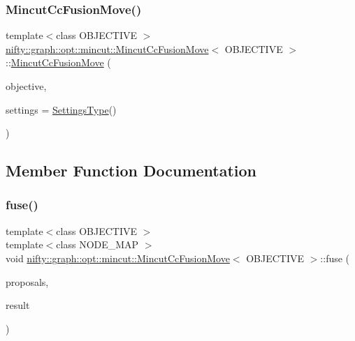 \subsubsection{\texorpdfstring{Mincut\+Cc\+Fusion\+Move()}{MincutCcFusionMove()}}
{\footnotesize\ttfamily template$<$class O\+B\+J\+E\+C\+T\+I\+VE $>$ \\
\hyperlink{classnifty_1_1graph_1_1opt_1_1mincut_1_1MincutCcFusionMove}{nifty\+::graph\+::opt\+::mincut\+::\+Mincut\+Cc\+Fusion\+Move}$<$ O\+B\+J\+E\+C\+T\+I\+VE $>$\+::\hyperlink{classnifty_1_1graph_1_1opt_1_1mincut_1_1MincutCcFusionMove}{Mincut\+Cc\+Fusion\+Move} (\begin{DoxyParamCaption}\item[{const \hyperlink{classnifty_1_1graph_1_1opt_1_1mincut_1_1MincutCcFusionMove_aa01f8621f491c8f77e106950d7525c37}{Objective\+Type} \&}]{objective,  }\item[{const \hyperlink{structnifty_1_1graph_1_1opt_1_1mincut_1_1MincutCcFusionMove_1_1SettingsType}{Settings\+Type} \&}]{settings = {\ttfamily \hyperlink{structnifty_1_1graph_1_1opt_1_1mincut_1_1MincutCcFusionMove_1_1SettingsType}{Settings\+Type}()} }\end{DoxyParamCaption})\hspace{0.3cm}{\ttfamily [inline]}}



\subsection{Member Function Documentation}
\mbox{\label{classnifty_1_1graph_1_1opt_1_1mincut_1_1MincutCcFusionMove_a9033e25b234036ee255fc1f1c4bc4574}} 
\subsubsection{\texorpdfstring{fuse()}{fuse()}\hspace{0.1cm}{\footnotesize\ttfamily [1/2]}}
{\footnotesize\ttfamily template$<$class O\+B\+J\+E\+C\+T\+I\+VE $>$ \\
template$<$class N\+O\+D\+E\+\_\+\+M\+AP $>$ \\
void \hyperlink{classnifty_1_1graph_1_1opt_1_1mincut_1_1MincutCcFusionMove}{nifty\+::graph\+::opt\+::mincut\+::\+Mincut\+Cc\+Fusion\+Move}$<$ O\+B\+J\+E\+C\+T\+I\+VE $>$\+::fuse (\begin{DoxyParamCaption}\item[{std\+::initializer\+\_\+list$<$ const N\+O\+D\+E\+\_\+\+M\+AP $\ast$$>$}]{proposals,  }\item[{N\+O\+D\+E\+\_\+\+M\+AP $\ast$}]{result }\end{DoxyParamCaption})\hspace{0.3cm}{\ttfamily [inline]}}

